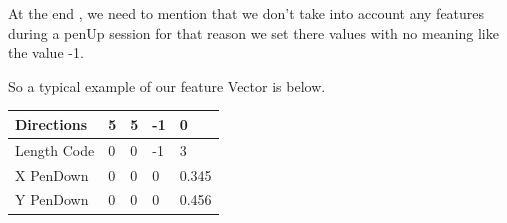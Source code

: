 \documentclass[a4paper, 10pt]{article}
\begin{document}
At the end , we need to mention that we don't take into account any features during a penUp session for that reason we set there values with no meaning like the value -1.

So a typical example of our feature Vector is below.
\begin{table}
    \begin{tabular}{|l|l|l|l|l|}
        \hline
        Directions  & 5 & 5 & -1 & 0     \\ \hline
        Length Code & 0 & 0 & -1 & 3     \\ 
        X PenDown   & 0 & 0 & 0  & 0.345 \\ 
        Y PenDown   & 0 & 0 & 0  & 0.456 \\
        \hline
    \end{tabular}
\end{table}
\end{document}
